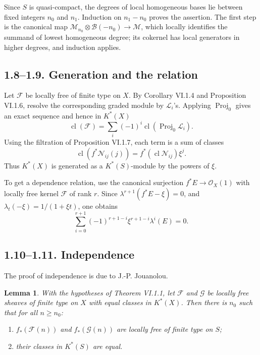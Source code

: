 \documentclass[13pt]{extarticle}
\newcommand{\cO}{\mathcal O}
\newcommand{\Proj}{\operatorname{Proj}}
\newcommand{\cl}{\operatorname{cl}}
\newtheorem*{lemma}{Lemma}
\begin{document}
Since $S$ is quasi-compact, the degrees of local homogeneous bases lie between fixed integers $n_0$ and $n_1$. Induction on $n_1-n_0$ proves the assertion. The first step is the canonical map $\mathcal M_{n_0}\otimes\mathcal B(-n_0)\to\mathcal M$, which locally identifies the summand of lowest homogeneous degree; its cokernel has local generators in higher degrees, and induction applies.

\subsection*{1.8--1.9. Generation and the relation}
Let $\mathcal F$ be locally free of finite type on $X$. By Corollary VI.1.4 and Proposition VI.1.6, resolve the corresponding graded module by $\mathcal L_i$'s. Applying $\Proj_0$ gives an exact sequence and hence in $K^*(X)$
\[
\cl(\mathcal F)=\sum_i(-1)^i\cl(\Proj_0\mathcal L_i).
\]
Using the filtration of Proposition VI.1.7, each term is a sum of classes
\[
\cl(f^*\mathcal N_{ij}(j))=f^*(\cl\mathcal N_{ij})\xi^j.
\]
Thus $K^*(X)$ is generated as a $K^*(S)$-module by the powers of $\xi$.

To get a dependence relation, use the canonical surjection $f^*E\to\cO_X(1)$ with locally free kernel $\mathcal F$ of rank $r$. Since $\lambda^{r+1}(f^*E-\xi)=0$, and $\lambda_t(-\xi)=1/(1+\xi t)$, one obtains
\begin{equation}\label{eq:VI.1.9.1}
\sum_{i=0}^{r+1}(-1)^{r+1-i}\xi^{r+1-i}\lambda^i(E)=0.
\end{equation}

\subsection*{1.10--1.11. Independence}
The proof of independence is due to J.-P. Jouanolou.

\begin{lemma}\label{lem:VI.1.10}
With the hypotheses of Theorem VI.1.1, let $\mathcal F$ and $\mathcal G$ be locally free sheaves of finite type on $X$ with equal classes in $K^*(X)$. Then there is $n_0$ such that for all $n\geq n_0$:
\begin{enumerate}[label=(\roman*)]
\item $f_*(\mathcal F(n))$ and $f_*(\mathcal G(n))$ are locally free of finite type on $S$;
\item their classes in $K^*(S)$ are equal.
\end{enumerate}
\end{lemma}
\end{document}
